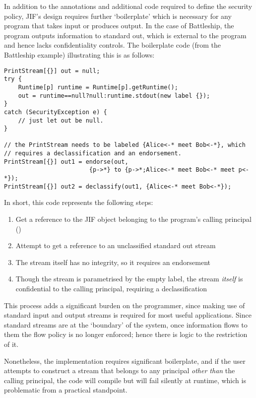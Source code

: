In addition to the annotations and additional code required to define the security policy, JIF's design requires further `boilerplate' which is necessary for any program that takes input or produces output. In the case of Battleship, the program outputs information to standard out, which is external to the program and hence lacks confidentiality controls. The boilerplate code (from the Battleship example) illustrating this is as follows:

\begin{verbatim}
PrintStream[{}] out = null;
try {
	Runtime[p] runtime = Runtime[p].getRuntime();
	out = runtime==null?null:runtime.stdout(new label {});
}
catch (SecurityException e) {
	// just let out be null.
}

// the PrintStream needs to be labeled {Alice<-* meet Bob<-*}, which
// requires a declassification and an endorsement.
PrintStream[{}] out1 = endorse(out, 
		   				{p->*} to {p->*;Alice<-* meet Bob<-* meet p<-*});
PrintStream[{}] out2 = declassify(out1, {Alice<-* meet Bob<-*});
\end{verbatim}

In short, this code represents the following steps:

\begin{enumerate}
	\item Get a reference to the JIF  object belonging to the program's calling principal ()
	
	\item Attempt to get a reference to an unclassified standard out stream
	
	\item The stream itself has no integrity, so it requires an endorsement
	
	\item Though the stream is parametrised by the empty label, the stream \textit{itself} is confidential to the calling principal, requiring a declassification
\end{enumerate}

This process adds a significant burden on the programmer, since making use of standard input and output streams is required for most useful applications. Since standard streams are at the `boundary' of the system, once information flows to them the flow policy is no longer enforced; hence there is logic to the restriction of it.

Nonetheless, the implementation requires significant boilerplate, and if the user attempts to construct a stream that belongs to any principal \textit{other than} the calling principal, the code will compile but will fail silently at runtime, which is problematic from a practical standpoint.


